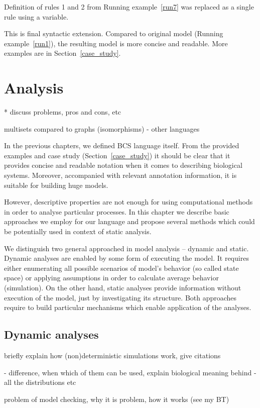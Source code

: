\documentclass[12pt]{fithesis2}
\begin{document}
\noindent Definition of rules 1 and 2 from Running example~\ref{run7} was replaced as a single rule using a variable.

This is final syntactic extension. Compared to original model (Running example~\ref{run1}), the resulting model is more concise and readable. More examples are in Section~\ref{case_study}.

\chapter{Analysis}

* discuss problems, pros and cons, etc

multisets compared to graphs (isomorphisms) - other languages

In the previous chapters, we defined BCS language itself. From the provided examples and case study (Section~\ref{case_study}) it should be clear that it provides concise and readable notation when it comes to describing biological systems. Moreover, accompanied with relevant annotation information, it is suitable for building huge models.

However, descriptive properties are not enough for using computational methods in order to analyse particular processes. In this chapter we describe basic approaches we employ for our language and propose several methods which could be potentially used in context of static analysis.

We distinguish two general approached in model analysis -- dynamic and static. Dynamic analyses are enabled by some form of executing the model. It requires either enumerating all possible scenarios of model's behavior (so called state space) or applying assumptions in order to calculate average behavior (simulation). On the other hand, static analyses provide information without execution of the model, just by investigating its structure. Both approaches require to build particular mechanisms which enable application of the analyses.

\section{Dynamic analyses}

briefly explain how (non)deterministic simulations work, give citations

 - difference, when which of them can be used, explain biological meaning behind
 - all the distributions etc

problem of model checking, why it is problem, how it works (see my BT) 
\end{document}
